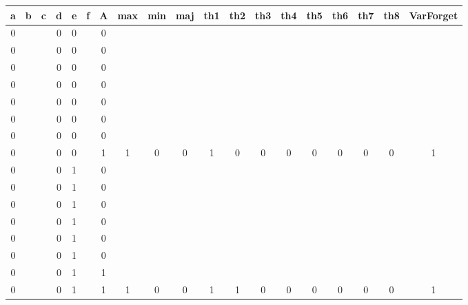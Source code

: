 \begin{table}[!tb]
    \centering
    \begin{tabular}{|c|c|c|c|c|c|c|c|c|c|c|c|c|c|c|c|c|c|c|}
        \hline
        \textbf{a} & \textbf{b} & \textbf{c} & \textbf{d} & \textbf{e} & \textbf{f} & \textbf{A} & \textbf{max} & \textbf{min} & \textbf{maj} & \textbf{th1} & \textbf{th2} & \textbf{th3} & \textbf{th4} & \textbf{th5} & \textbf{th6} & \textbf{th7} & \textbf{th8} & \textbf{VarForget} \\ \hline
        \rowcolor{gray!40} 0 &  &  & 0 & 0 &  & 0 &  &  &  &  &  &  &  &  &  &  &  &  \\ \hline
        \rowcolor{gray!40} 0 &  &  & 0 & 0 &  & 0 &  &  &  &  &  &  &  &  &  &  &  &  \\ \hline
        \rowcolor{gray!40} 0 &  &  & 0 & 0 &  & 0 &  &  &  &  &  &  &  &  &  &  &  &  \\ \hline
        \rowcolor{gray!40} 0 &  &  & 0 & 0 &  & 0 &  &  &  &  &  &  &  &  &  &  &  &  \\ \hline
        \rowcolor{gray!40} 0 &  &  & 0 & 0 &  & 0 &  &  &  &  &  &  &  &  &  &  &  &  \\ \hline
        \rowcolor{gray!40} 0 &  &  & 0 & 0 &  & 0 &  &  &  &  &  &  &  &  &  &  &  &  \\ \hline
        \rowcolor{gray!40} 0 &  &  & 0 & 0 &  & 0 &  &  &  &  &  &  &  &  &  &  &  &  \\ \hline
        \rowcolor{gray!40} 0 &  &  & 0 & 0 &  & 1 & 1 & 0 & 0 & 1 & 0 & 0 & 0 & 0 & 0 & 0 & 0 & 1 \\ \hline
        \rowcolor{blue!40} 0 &  &  & 0 & 1 &  & 0 &  &  &  &  &  &  &  &  &  &  &  &  \\ \hline
        \rowcolor{blue!40} 0 &  &  & 0 & 1 &  & 0 &  &  &  &  &  &  &  &  &  &  &  &  \\ \hline
        \rowcolor{blue!40} 0 &  &  & 0 & 1 &  & 0 &  &  &  &  &  &  &  &  &  &  &  &  \\ \hline
        \rowcolor{blue!40} 0 &  &  & 0 & 1 &  & 0 &  &  &  &  &  &  &  &  &  &  &  &  \\ \hline
        \rowcolor{blue!40} 0 &  &  & 0 & 1 &  & 0 &  &  &  &  &  &  &  &  &  &  &  &  \\ \hline
        \rowcolor{blue!40} 0 &  &  & 0 & 1 &  & 0 &  &  &  &  &  &  &  &  &  &  &  &  \\ \hline
        \rowcolor{blue!40} 0 &  &  & 0 & 1 &  & 1 &  &  &  &  &  &  &  &  &  &  &  &  \\ \hline
        \rowcolor{blue!40} 0 &  &  & 0 & 1 &  & 1 & 1 & 0 & 0 & 1 & 1 & 0 & 0 & 0 & 0 & 0 & 0 & 1 \\ \hline

\end{tabular}
\end{table}
